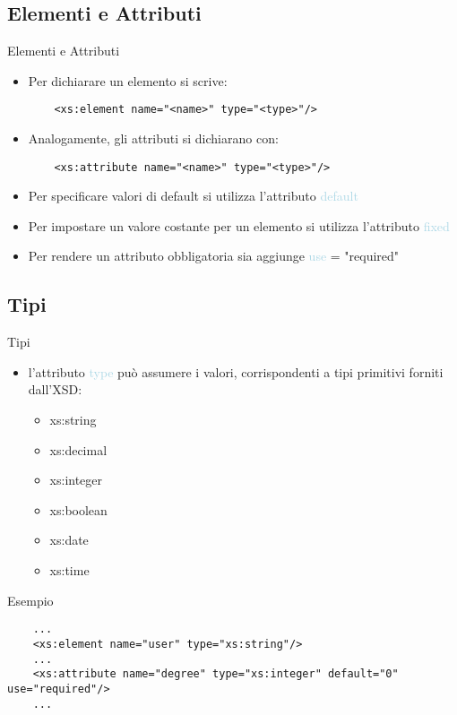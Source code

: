 \documentclass{beamer}
\begin{document}
   \subsection{Elementi e Attributi}
   \begin{frame}[containsverbatim]{Elementi e Attributi}
   \begin{itemize}
   \item Per dichiarare un elemento si scrive:
   	\begin{lstlisting}
	<xs:element name="<name>" type="<type>"/>
	\end{lstlisting}
	\item Analogamente, gli attributi si dichiarano con:
   \begin{lstlisting}
	<xs:attribute name="<name>" type="<type>"/>
	\end{lstlisting}
	\item Per specificare valori di default si utilizza l'attributo
	\textcolor{lightblue}{default}
	\item Per impostare un valore costante per un elemento si utilizza l'attributo
	\textcolor{lightblue}{fixed}
	\item Per rendere un attributo obbligatoria sia aggiunge \textcolor{lightblue}{use} = \textcolor{mauve}{"required"}
   \end{itemize}
   \end{frame}
   	\subsection{Tipi}
   \begin{frame}[containsverbatim]{Tipi}
   \begin{itemize}
   	\item l'attributo \textcolor{lightblue}{type} può assumere i valori, corrispondenti a tipi primitivi forniti dall'XSD:
   \begin{itemize}
    \item xs:string
    \item xs:decimal
    \item xs:integer
    \item xs:boolean
    \item xs:date
    \item xs:time
   \end{itemize}
   \end{itemize}
   \end{frame}
   \begin{frame}[containsverbatim]
      \begin{block}{Esempio}
   \begin{lstlisting}
    ...
	<xs:element name="user" type="xs:string"/>
	...
	<xs:attribute name="degree" type="xs:integer" default="0" use="required"/>
	...
	\end{lstlisting}
   \end{block}
   \end{frame}
\end{document}
